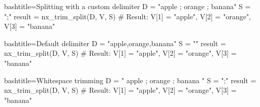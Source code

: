 \begin{NexCodeBox}{bash}{title={Splitting with a custom delimiter}}
	D = "apple ; orange ; banana"
	S = ";"
	result = nx_trim_split(D, V, S)
	# Result: V[1] = "apple", V[2] = "orange", V[3] = "banana"
\end{NexCodeBox}

\begin{NexCodeBox}{bash}{title={Default delimiter}}
	D = "apple,orange,banana"
	S = ""
	result = nx_trim_split(D, V, S)
	# Result: V[1] = "apple", V[2] = "orange", V[3] = "banana"
\end{NexCodeBox}

\begin{NexCodeBox}{bash}{title={Whitespace trimming}}
	D = "  apple  ; orange ;   banana   "
	S = ";"
	result = nx_trim_split(D, V, S)
	# Result: V[1] = "apple", V[2] = "orange", V[3] = "banana"
\end{NexCodeBox}

